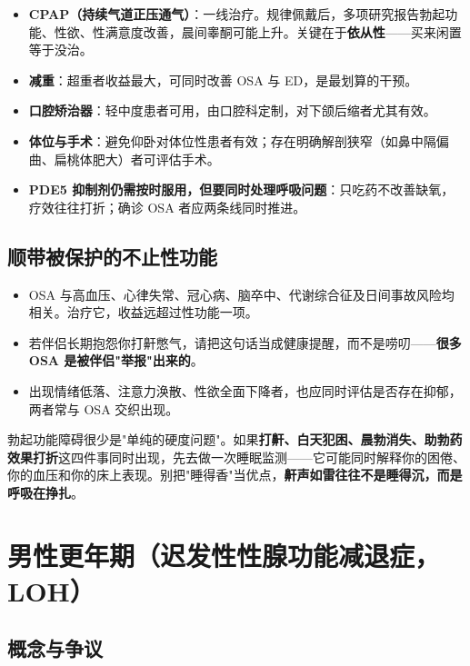 \begin{itemize}
	\item \textbf{CPAP（持续气道正压通气）}：一线治疗。规律佩戴后，多项研究报告勃起功能、性欲、性满意度改善，晨间睾酮可能上升。关键在于\textbf{依从性}——买来闲置等于没治。
	\item \textbf{减重}：超重者收益最大，可同时改善 OSA 与 ED，是最划算的干预。
	\item \textbf{口腔矫治器}：轻中度患者可用，由口腔科定制，对下颌后缩者尤其有效。
	\item \textbf{体位与手术}：避免仰卧对体位性患者有效；存在明确解剖狭窄（如鼻中隔偏曲、扁桃体肥大）者可评估手术。
	\item \textbf{PDE5 抑制剂仍需按时服用，但要同时处理呼吸问题}：只吃药不改善缺氧，疗效往往打折；确诊 OSA 者应两条线同时推进。
\end{itemize}

\subsection{顺带被保护的不止性功能}

\begin{itemize}
	\item OSA 与高血压、心律失常、冠心病、脑卒中、代谢综合征及日间事故风险均相关。治疗它，收益远超过性功能一项。
	\item 若伴侣长期抱怨你打鼾憋气，请把这句话当成健康提醒，而不是唠叨——\textbf{很多 OSA 是被伴侣"举报"出来的}。
	\item 出现情绪低落、注意力涣散、性欲全面下降者，也应同时评估是否存在抑郁，两者常与 OSA 交织出现。
\end{itemize}

\begin{tcolorbox}[colback=pink!5!white,colframe=red!50!black,title=贴心小叮咛]
勃起功能障碍很少是"单纯的硬度问题"。如果\textbf{打鼾、白天犯困、晨勃消失、助勃药效果打折}这四件事同时出现，先去做一次睡眠监测——它可能同时解释你的困倦、你的血压和你的床上表现。别把"睡得香"当优点，\textbf{鼾声如雷往往不是睡得沉，而是呼吸在挣扎}。
\end{tcolorbox}

\section{男性更年期（迟发性性腺功能减退症，LOH）}
\label{sec:male_menopause}

\subsection{概念与争议}

